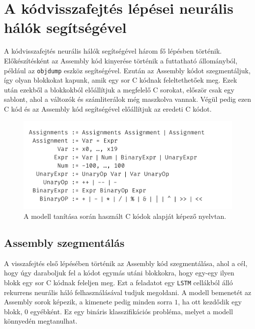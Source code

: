 \chapter{A kódvisszafejtés lépései neurális hálók segítségével}
\label{ch:decomp}

A kódvisszafejtés neurális hálók segítségével három fő lépésben történik.
Előkészítésként az Assembly kód kinyerése történik a futtatható állományból,
például az \texttt{objdump}\cite{binutils} eszköz segítségével. Ezután az Assembly
kódot szegmentáljuk, így olyan blokkokat kapunk, amik egy sor C kódnak feleltethetőek
meg. Ezek után ezekből a blokkokból előállítjuk a megfelelő C sorokat, először csak
egy sablont, ahol a változók és számliterálok még maszkolva vannak. Végül pedig ezen
C kód és az Assembly kód segítségével előállítjuk az eredeti C kódot.

\begin{figure}[H]
	\centering
	\includegraphics[width=1\textwidth,frame]{images/grammar.pdf}
	\caption{A modell tanítása során használt C kódok alapját képező nyelvtan.}
	\label{fig:grammar}
\end{figure}

\section{Assembly szegmentálás}

A visszafejtés első lépésében történik az Assembly kód szegmentálása, ahol
a cél, hogy úgy daraboljuk fel a kódot egymás utáni blokkokra, hogy egy-egy ilyen blokk egy
sor C kódnak feleljen meg. Ezt a feladatot egy \texttt{LSTM}\cite{lstm} cellákból álló
rekurrens neurális háló felhasználásával tudjuk megoldani. A modell bemenetét az Assembly sorok képezik,
a kimenete pedig minden sorra $1$, ha ott kezdődik egy blokk, $0$ egyébként. Ez
egy bináris klasszifikációs probléma, melyet a modell könnyedén megtanulhat.

